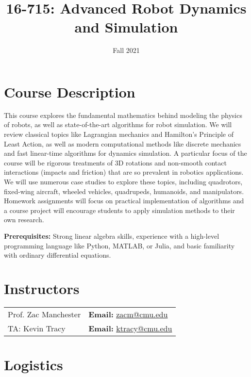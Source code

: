 \documentclass[11pt,letterpaper]{article}
\title{16-715: Advanced Robot Dynamics and Simulation}
\author{Fall 2021}
\date{}
\begin{document}
\maketitle

\section*{Course Description}

This course explores the fundamental mathematics behind modeling the physics of robots, as well as state-of-the-art algorithms for robot simulation. We will review classical topics like Lagrangian mechanics and Hamilton's Principle of Least Action, as well as modern computational methods like discrete mechanics and fast linear-time algorithms for dynamics simulation. A particular focus of the course will be rigorous treatments of 3D rotations and non-smooth contact interactions (impacts and friction) that are so prevalent in robotics applications. We will use numerous case studies to explore these topics, including quadrotors, fixed-wing aircraft, wheeled vehicles, quadrupeds, humanoids, and manipulators. Homework assignments will focus on practical implementation of algorithms and a course project will encourage students to apply simulation methods to their own research.

\medskip
\noindent
\textbf{Prerequisites:} Strong linear algebra skills, experience with a high-level programming language like Python, MATLAB, or Julia, and basic familiarity with ordinary differential equations.

\section*{Instructors}

\begin{center}
\begin{tabular}{l l}
	Prof. Zac Manchester & \textbf{Email:} \href{mailto:zacm@cmu.edu}{zacm@cmu.edu} \\
	TA: Kevin Tracy & \textbf{Email:} \href{mailto:ktracy@cmu.edu}{ktracy@cmu.edu}
\end{tabular}
\end{center}

\section*{Logistics}
\end{document}
